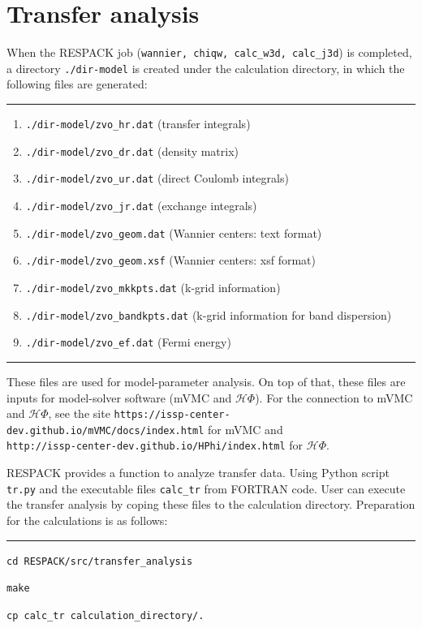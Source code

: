 \documentclass{article}
\begin{document}
\section{Transfer analysis}
When the RESPACK job ({\tt wannier, chiqw, calc\_w3d, calc\_j3d}) is completed, a directory {\tt ./dir-model} is created under the calculation directory, in which the following files are generated: 
\vspace{3mm}\hrule
\begin{enumerate}
\item \verb+./dir-model/zvo_hr.dat+ (transfer integrals)
\item \verb+./dir-model/zvo_dr.dat+ (density matrix)
\item \verb+./dir-model/zvo_ur.dat+ (direct Coulomb integrals)
\item \verb+./dir-model/zvo_jr.dat+ (exchange integrals)
\item \verb+./dir-model/zvo_geom.dat+ (Wannier centers: text format)
\item \verb+./dir-model/zvo_geom.xsf+ (Wannier centers: xsf format)
\item \verb+./dir-model/zvo_mkkpts.dat+ (k-grid information)
\item \verb+./dir-model/zvo_bandkpts.dat+ (k-grid information for band dispersion)
\item \verb+./dir-model/zvo_ef.dat+ (Fermi energy)
\end{enumerate}
\hrule\vspace{3mm}
These files are used for model-parameter analysis. On top of that, these files are inputs for model-solver software (mVMC and $\mathcal{H}\Phi$). For the connection to mVMC and $\mathcal{H}\Phi$, see the site \texttt{https://issp-center-dev.github.io/mVMC/docs/index.html} for mVMC and \\   \texttt{http://issp-center-dev.github.io/HPhi/index.html} for $\mathcal{H}\Phi$.

RESPACK provides a function to analyze transfer data. Using {\sc Python} script {\tt tr.py} and the executable files {\tt calc\_tr} from {\sc FORTRAN} code. User can execute the transfer analysis by coping these files to the calculation directory. Preparation for the calculations is as follows: 
\vspace{3mm}\hrule\vspace{3mm}
\texttt{cd RESPACK/src/transfer\_analysis}

\texttt{make}

\texttt{cp calc\_tr calculation\_directory/.}
\end{document}
